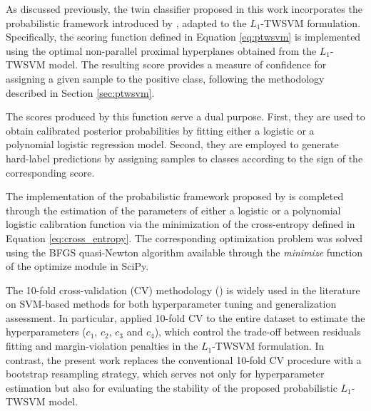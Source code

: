 \documentclass[12pt]{report} %
\begin{document}
\newpage

As discussed previously, the twin classifier proposed in this work incorporates the probabilistic framework introduced by \cite{shao2012probabilistic}, adapted to the $L_1$-TWSVM formulation. Specifically, the scoring function defined in Equation \ref{eq:ptwsvm} is implemented using the optimal non-parallel proximal hyperplanes obtained from the $L_1$-TWSVM model. The resulting score provides a measure of confidence for assigning a given sample to the positive class, following the methodology described in Section \ref{sec:ptwsvm}.

The scores produced by this function serve a dual purpose. First, they are used to obtain calibrated posterior probabilities by fitting either a logistic or a polynomial logistic regression model. Second, they are employed to generate hard-label predictions by assigning samples to classes according to the sign of the corresponding score.

The implementation of the probabilistic framework proposed by \cite{shao2012probabilistic} is completed through the estimation of the parameters of either a logistic or a polynomial logistic calibration function via the minimization of the cross-entropy defined in Equation \ref{eq:cross_entropy}. The corresponding optimization problem was solved using the BFGS quasi-Newton algorithm available through the \textit{minimize} function of the optimize module in SciPy.

The 10-fold cross-validation (CV) methodology (\cite{kohavi1995study}) is widely used in the literature on SVM-based methods for both hyperparameter tuning and generalization assessment. In particular, \cite{bai2014novel} applied 10-fold CV to the entire dataset to estimate the hyperparameters ($c_1$, $c_2$, $c_3$ and $c_4$), which control the trade-off between residuals fitting and margin-violation penalties in the $L_1$-TWSVM formulation. In contrast, the present work replaces the conventional 10-fold CV procedure with a bootstrap resampling strategy, which serves not only for hyperparameter estimation but also for evaluating the stability of the proposed probabilistic $L_1$-TWSVM model.
\end{document}
